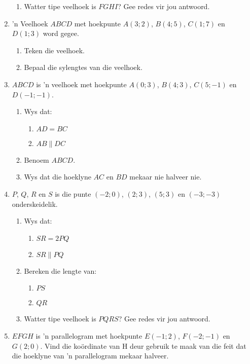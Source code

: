 \begin{eocexercises}{}
\begin{enumerate}[noitemsep, label=\textbf{\arabic*}. ]
\begin{enumerate}[noitemsep, label=\textbf{(\alph*)} ]
\item Watter tipe veelhoek is  $FGHI$? Gee redes vir jou antwoord.
\end{enumerate}
\item  ’n Veelhoek $ABCD$ met hoekpunte $A(3;2)$, $B(4;5)$, $C(1;7)$ en $D(1;3)$ word gegee.
\begin{enumerate}[noitemsep, label=\textbf{(\alph*)} ]
\item  Teken die veelhoek.
\item  Bepaal die sylengtes van die veelhoek.
\end{enumerate}
\item $ABCD$ is ’n veelhoek met hoekpunte $A(0;3)$, $B(4;3)$, $C(5;-1)$ en $D(-1;-1)$.
\begin{enumerate}[noitemsep, label=\textbf{(\alph*)} ]
\item Wys dat:
\begin{enumerate}[noitemsep, label=\textbf{(\roman*)} ]
\item $AD = BC$
\item $AB \parallel DC$
\end{enumerate}
\item Benoem $ABCD$.
\item Wys dat die hoeklyne $AC$ en $BD$ mekaar nie halveer nie.
\end{enumerate}
\item $P$, $Q$, $R$ en $S$ is die punte $(-2;0)$, $(2;3)$, $(5;3)$ en $(-3;-3)$ onderskeidelik.
\begin{enumerate}[noitemsep, label=\textbf{(\alph*)} ]
\item Wys dat:
\begin{enumerate}[noitemsep, label=\textbf{(\roman*)} ]
\item $SR = 2PQ$
\item $SR \parallel PQ$
\end{enumerate}
\item Bereken die lengte van:
\begin{enumerate}[noitemsep, label=\textbf{(\roman*)} ]
\item $PS$
\item $QR$
\end{enumerate}
\item Watter tipe veelhoek is $PQRS$? Gee redes vir jou antwoord.
\end{enumerate}
\item $EFGH$ is ’n parallelogram met hoekpunte $E(-1;2)$, $F(-2;-1)$ en $G(2;0)$. Vind die koördinate van H deur gebruik te maak van die feit dat die hoeklyne van ’n parallelogram mekaar halveer.

\end{enumerate}
\end{eocexercises}

